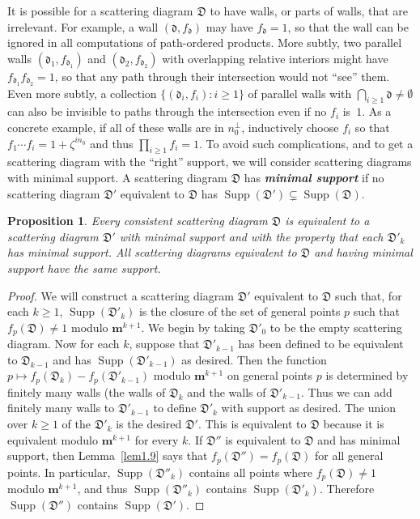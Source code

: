 \documentclass{amsart}
\newtheorem{prop}[proposition]{Proposition}
\theoremstyle{definition}
\theoremstyle{remark}
\numberwithin{equation}{section}
\newcommand{\newword}[1]{\textbf{\emph{#1}}}
\newcommand{\set}[1]{{\lbrace #1 \rbrace}}
\newcommand{\D}{{\mathfrak D}}
\newcommand{\0}{{\mathbf{0}}}
\newcommand{\m}{\mathbf{m}}
\newcommand{\Supp}{\operatorname{Supp}}
\renewcommand{\d}{{\mathfrak d}}
\begin{document}
It is possible for a scattering diagram $\D$ to have walls, or parts of walls, that are irrelevant.
For example, a wall $(\d,f_\d)$ may have $f_\d=1$, so that the wall can be ignored in all computations of path-ordered products.
More subtly, two parallel walls $(\d_1,f_{\d_1})$ and $(\d_2,f_{\d_2})$ with overlapping relative interiors might have $f_{\d_1}f_{\d_2}=1$, so that any path through their intersection would not ``see'' them.
Even more subtly, a collection $\set{(\d_i,f_i):i\ge1}$ of parallel walls with $\bigcap_{i\ge1}\d\neq\emptyset$ can also be invisible to paths through the intersection even if no $f_i$ is~$1$.
As a concrete example, if all of these walls are in $n_0^\perp$, inductively choose $f_i$ so that $f_1\cdots f_i=1+\zeta^{in_0}$ and thus $\prod_{i\ge1}f_i=1$.
To avoid such complications, and to get a scattering diagram with the ``right'' support, we will consider scattering diagrams with minimal support.
A scattering diagram $\D$ has \newword{minimal support} if no scattering diagram $\D'$ equivalent to $\D$ has $\Supp(\D')\subsetneq\Supp(\D)$.

\begin{prop}\label{min sup}
Every consistent scattering diagram $\D$ is equivalent to a scattering diagram $\D'$ with minimal support and with the property that each $\D'_k$ has minimal support.
All scattering diagrams equivalent to $\D$ and having minimal support have the same support.
\end{prop}
\begin{proof}  
We will construct a scattering diagram $\D'$ equivalent to $\D$ such that, for each $k\ge1$, $\Supp(\D'_k)$ is the closure of the set of general points $p$ such that $f_p(\D)\neq1$ modulo $\m^{k+1}$.
We begin by taking $\D'_0$ to be the empty scattering diagram.
Now for each $k$, suppose that $\D'_{k-1}$ has been defined to be equivalent to $\D_{k-1}$ and has $\Supp(\D'_{k-1})$ as desired.
Then the function $p\mapsto f_p(\D_k)-f_p(\D'_{k-1})$ modulo $\m^{k+1}$ on general points $p$ is determined by finitely many walls (the walls of $\D_k$ and the walls of $\D'_{k-1}$.
Thus we can add finitely many walls to $\D'_{k-1}$ to define $\D'_k$ with support as desired.
The union over $k\ge1$ of the $\D'_k$ is the desired $\D'$.
This is equivalent to $\D$ because it is equivalent modulo $\m^{k+1}$ for every $k$.
If $\D''$ is equivalent to $\D$ and has minimal support, then Lemma~\ref{lem1.9} says that $f_p(\D'')=f_p(\D)$ for all general points.
In particular, $\Supp(\D''_k)$ contains all points where $f_p(\D)\neq1$ modulo $\m^{k+1}$, and thus $\Supp(\D''_k)$ contains $\Supp(\D'_k)$.
Therefore $\Supp(\D'')$ contains $\Supp(\D')$.
\end{proof}
\end{document}
